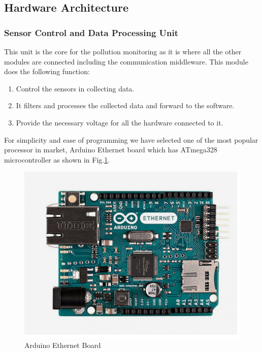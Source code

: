      \subsection{Hardware Architecture}
\subsubsection{Sensor Control and Data Processing Unit}
This unit is the core for the pollution monitoring as it is where all the other modules are connected including the communication middleware. This module does the following function:


\begin{enumerate}

\item Control the sensors in collecting data.
\item It filters and processes the collected data and forward to the software.
\item Provide the necessary voltage for all the hardware connected to it.

\end{enumerate}
For simplicity and ease of programming we have selected one of the most popular processor in market, Arduino Ethernet board which has ATmega328 microcontroller as shown in Fig.\ref{Arduino}. 

\begin{figure}[h]
  \begin{center}
  \includegraphics[scale=0.80]{./images/figure3.png}
  \end{center}
  \caption{Arduino Ethernet Board}
  \label{Arduino}
\end{figure}

